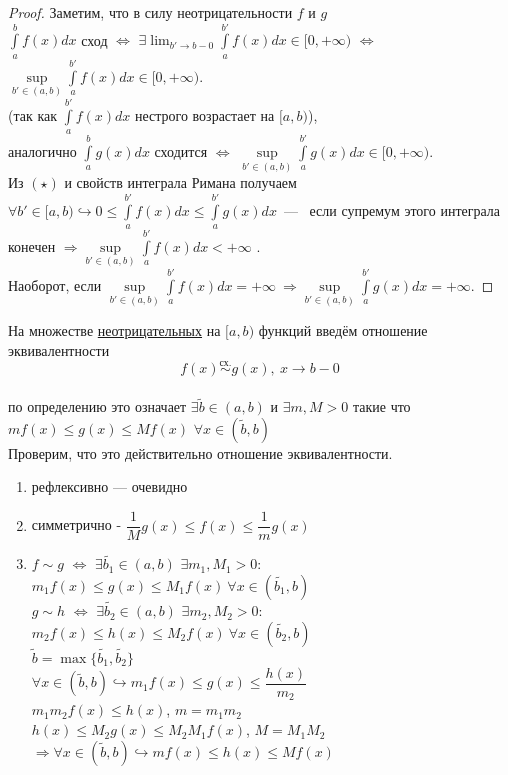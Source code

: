 \begin{proof}
    Заметим, что в силу неотрицательности $f$ и $g$ \\
    $\int \limits_a^b f(x)dx$ сход $\Longleftrightarrow$ $\exists \lim_{b' \to b - 0} \int \limits_a^{b'} f(x) dx \in [0, +\infty)$ $\Longleftrightarrow$ $\sup \limits_{b' \in (a, b)} \int \limits_a^{b'} f(x) dx \in [0, +\infty).$\\
    (так как $\int \limits_a^{b'} f(x) dx$ нестрого возрастает на $[a, b)$), \\
    аналогично $\int \limits_a^b g(x) dx$ сходится $\Longleftrightarrow$ $\sup \limits_{b' \in (a, b)} \int \limits_a^{b'} g(x) dx \in [0, +\infty).$ \\
    Из $(\star)$ и свойств интеграла Римана получаем \\
    $\forall b' \in [a, b) \hookrightarrow 0 \leq \int \limits_a^{b'} f(x)dx \leq \int \limits_a^{b'} g(x) dx$~---~ если супремум этого интеграла конечен $\Longrightarrow \sup \limits_{b' \in (a, b)} \int \limits_a^{b'} f(x)dx < +\infty$ . \\
    Наоборот, если $\sup \limits_{b' \in (a, b)} \int \limits_a^{b'} f(x) dx = +\infty \ \Longrightarrow \sup \limits_{b' \in (a, b)} \int \limits_a^{b'} g(x)dx = +\infty.$
\end{proof}

На множестве \underline{неотрицательных} на $[a, b)$ функций введём отношение эквивалентности \\
$$f(x) \overset{\text{сх.}}{\sim} g(x), \ x \to b - 0$$ \\
по определению это означает 
$\exists \widetilde{b} \in (a, b)$ и $\exists m, M > 0$ такие что \\
$mf(x) \leq g(x) \leq Mf(x)$ $\forall x \in (\widetilde{b}, b)$ \\
Проверим, что это действительно отношение эквивалентности. \\
\begin{enumerate}
    \item рефлексивно — очевидно
    \item симметрично - $\dfrac{1}{M} g(x) \leq f(x) \leq \dfrac{1}{m} g(x) $
    \item $f \sim g$ $\Longleftrightarrow$ $\exists \widetilde{b_1} \in (a, b)$ $\exists m_1, M_1 > 0:$ $m_1 f(x) \leq g(x) \leq M_1 f(x) \ \forall x \in (\widetilde{b_1}, b)$ \\
    $g \sim h$ $\Longleftrightarrow$ $\exists \widetilde{b_2} \in (a, b)$ $\exists m_2, M_2 > 0:$ $m_2 f(x) \leq h(x) \leq M_2 f(x) \ \forall x \in (\widetilde{b_2}, b)$ \\
    $\widetilde{b} = \max\{\widetilde{b_1}, \widetilde{b_2}\}$ \\
    $\forall x \in (\widetilde{b}, b) \hookrightarrow m_1 f(x) \leq g(x) \leq \dfrac{h(x)}{m_2}$ \\
    $m_1 m_2 f(x) \leq h(x)$, $m = m_1 m_2$ \\
    $h(x) \leq M_2 g(x) \leq M_2 M_1 f(x)$, $M = M_1 M_2$ \\
    $\Longrightarrow \forall x \in (\widetilde{b}, b) \hookrightarrow mf(x) \leq h(x) \leq Mf(x)$
\end{enumerate}

